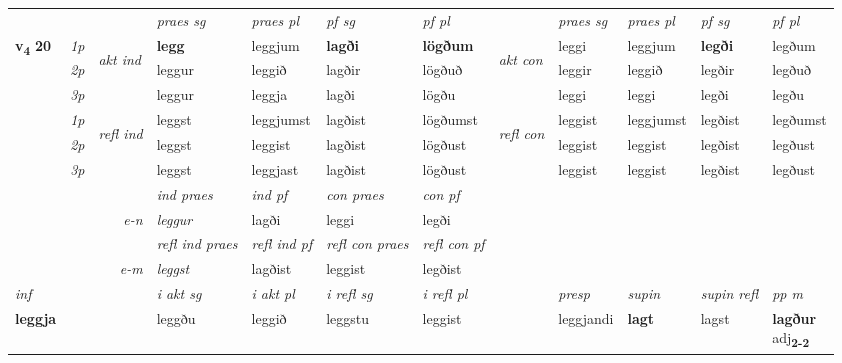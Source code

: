\begin{longtable}[l]{X>{\footnotesize\itshape}llXXXXlXXXX}
\midrule
 & &   & \textit{praes sg}  & \textit{praes pl}    & \textit{ pf sg} & \textit{pf pl} & & \textit{praes sg}  & \textit{praes pl}    & \textit{pf sg} & \textit{pf pl }  \\ \cmidrule{4-7} \cmidrule{9-12}
 \multirow{2}{*}{{{\textbf{v{\textsubscript{4}}} \Large{\textbf{20}}}}}  & 1p & \multirow{3}{*}{\begin{turn}{90}\textit{akt ind}\end{turn}} & \textbf{legg} & leggjum & \textbf{lagði} & \textbf{lögðum} & \multirow{3}{*}{\begin{turn}{90}\textit{akt con}\end{turn}} &leggi & leggjum & \textbf{legði} & legðum\\*
 & 2p &  &  leggur  & leggið & lagðir & lögðuð & & leggir & leggið & legðir & legðuð \\*
 & 3p &  & leggur & leggja & lagði & lögðu & & leggi & leggi& legði & legðu \\*
\cmidrule{4-7} \cmidrule{9-12}
 & 1p & \multirow{3}{*}{\begin{turn}{90}\textit{refl ind}\end{turn}}  & leggst & leggjumst & lagðist & lögðumst & \multirow{3}{*}{\begin{turn}{90}\textit{refl con}\end{turn}}  &leggist & leggjumst & legðist & legðumst \\*
 & 2p &  & leggst & leggist & lagðist & lögðust & &leggist & leggist & legðist & legðust \\*
 & 3p  & & leggst & leggjast & lagðist & lögðust & & leggist & leggist& legðist & legðust \\*
\cmidrule{4-7} \cmidrule{9-12}

   && &  \textit{ind praes} & \textit{ind pf} & \textit{con praes} & \textit{con pf} \\*
\multicolumn{3}{r}{\textit{e-n}} & leggur & lagði & leggi & legði \\*

\cmidrule{4-7}
 & && \textit{refl ind praes} & \textit{refl ind pf} & \textit{refl con praes} & \textit{refl con pf} \\*
\multicolumn{3}{r}{\textit{e-m}}& leggst & lagðist & leggist & legðist \\*

\cmidrule{4-7}
   {\textit{inf}} & &  & \textit{i akt sg} & \textit{i akt pl} & \textit{i refl sg} & \textit{i refl pl} && \textit{presp} & \textit{supin} & \textit{supin refl} & \textit{pp m} \\*
  {\textbf{leggja}} & && leggðu  & leggið & leggstu & leggist && leggjandi &  \textbf{lagt} & lagst & \specialcell{\textbf{lagður} \\ adj\textbf{\textsubscript{2-2}}} \\*


\end{longtable}
